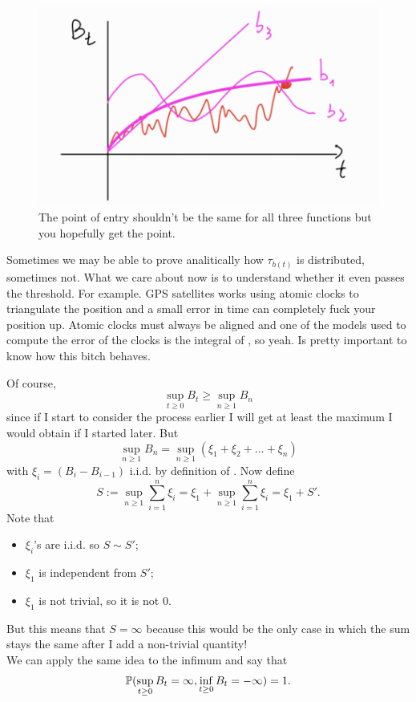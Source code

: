 \documentclass[12pt]{report}
\begin{document}
\begin{figure}[H]
	\centering
	\includegraphics[width=0.5\linewidth]{img/screenshot017}
	\caption{The point of entry shouldn't be the same for all three functions but you hopefully get the point.}
	\label{fig:screenshot017}
\end{figure}
Sometimes we may be able to prove analitically how $\tau_{b(t)}$ is distributed, sometimes not. What we care about now is to understand whether it even passes the threshold. For example. GPS satellites works using atomic clocks to triangulate the position and a small error in time can completely fuck your position up. Atomic clocks must always be aligned and one of the models used to compute the error of the clocks is the integral of \bwm, so yeah. Is pretty important to know how this bitch behaves.
\begin{remark}
	Of course, 
	\begin{equation*}
		\sup_{t\geq0}B_{t}\geq\sup_{n\geq 1}B_{n}
	\end{equation*}
	since if I start to consider the process earlier I will get at least the maximum I would obtain if I started later. But
	\begin{equation*}
		\sup_{n\geq 1}B_{n}=\sup_{n\geq 1}(\xi_{1}+\xi_{2}+\ldots+\xi_{n})
	\end{equation*}
	with $\xi_{i}=(B_{i}-B_{i-1})$ i.i.d. by definition of \bwm. Now define
	\begin{equation*}
		S:=\sup_{n\geq 1}\sum_{i=1}^{n}\xi_{i}=\xi_{1}+\sup_{n\geq 1}\sum_{i=1}^{n}\xi_{i}=\xi_{1}+S'.
	\end{equation*}
	Note that
	\begin{itemize}
		\item $\xi_{i}$'s are i.i.d. so $S\sim S'$;
		\item $\xi_{1}$ is independent from $S'$;
		\item $\xi_{1}$ is not trivial, so it is not 0.
	\end{itemize}
	But this means that $S=\infty$ \as{} because this would be the only case in which the sum stays the same after I add a non-trivial quantity!\\
	We can apply the same idea to the infimum and say that
	\begin{equation*}
		\mathbb{P}(\sup_{t\geq 0} B_{t}=\infty,\inf_{t\geq 0} B_{t}=-\infty)=1.
	\end{equation*}
\end{remark}
\end{document}
